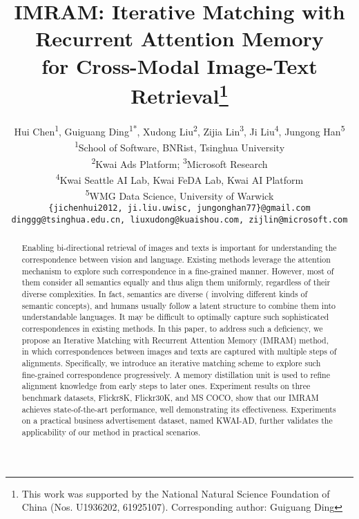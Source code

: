 \documentclass[10pt,twocolumn,letterpaper]{article}
\newcommand{\Ads}{KWAI-AD}
\begin{document}
\title{IMRAM: Iterative Matching with Recurrent Attention Memory \\ for Cross-Modal Image-Text Retrieval\thanks{This work was supported by the National Natural Science
Foundation of China (Nos. U1936202, 61925107). Corresponding author: Guiguang Ding}}

\author{Hui Chen\textsuperscript{1}, Guiguang Ding\textsuperscript{1*}, Xudong Liu\textsuperscript{2}, Zijia Lin\textsuperscript{3}, Ji Liu\textsuperscript{4}, Jungong Han\textsuperscript{5}\\
\textsuperscript{1}School of Software, BNRist, Tsinghua University\\
\textsuperscript{2}Kwai Ads Platform; \textsuperscript{3}Microsoft Research\\
\textsuperscript{4}Kwai Seattle AI Lab, Kwai FeDA Lab, Kwai AI Platform\\
\textsuperscript{5}WMG Data Science, University of Warwick\\
{\tt\small \{jichenhui2012, ji.liu.uwisc, jungonghan77\}@gmail.com}\\
{\tt\small dinggg@tsinghua.edu.cn, liuxudong@kuaishou.com, zijlin@microsoft.com}
}

\maketitle


\begin{abstract}
Enabling bi-directional retrieval of images and texts is important for understanding the correspondence between vision and language. Existing methods leverage the attention mechanism to explore such correspondence in a fine-grained manner. However, most of them consider all semantics equally and thus align them uniformly, regardless of their diverse complexities. In fact, semantics are diverse (\ie{} involving different kinds of semantic concepts), and humans usually follow a latent structure to combine them into understandable languages. It may be difficult to optimally capture such sophisticated correspondences in existing methods. 
In this paper, to address such a deficiency, we propose an Iterative Matching with Recurrent Attention Memory (IMRAM) method, in which correspondences between images and texts are captured with multiple steps of alignments. Specifically, we introduce an iterative matching scheme to explore such fine-grained correspondence progressively. A memory distillation unit is used to refine alignment knowledge from early steps to later ones. Experiment results on three benchmark datasets, \ie{} Flickr8K, Flickr30K, and MS COCO, show that our IMRAM achieves state-of-the-art performance, well demonstrating its effectiveness. Experiments on a practical business advertisement dataset, named \Ads{}, further validates the applicability of our method in practical scenarios.
\end{abstract}
\end{document}
